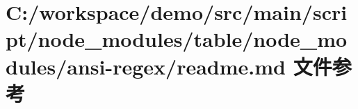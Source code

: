 \hypertarget{node__modules_2table_2node__modules_2ansi-regex_2_r_e_a_d_m_e_8md}{}\section{C\+:/workspace/demo/src/main/script/node\+\_\+modules/table/node\+\_\+modules/ansi-\/regex/readme.md 文件参考}
\label{node__modules_2table_2node__modules_2ansi-regex_2_r_e_a_d_m_e_8md}
